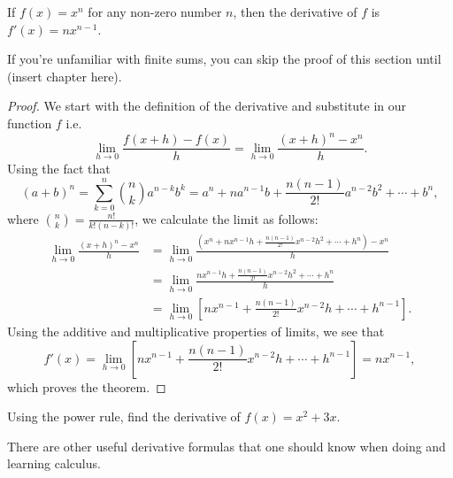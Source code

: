 \begin{prop}\label{PowRule}
	If $f(x)=x^n$ for any non-zero number $n$, then the derivative of $f$ is  $f'(x)=nx^{n-1}$.
\end{prop}

If you're unfamiliar with finite sums, you can skip the proof of this section until (insert chapter here).

\begin{proof}
	We start with the definition of the derivative and substitute in our function $f$ i.e.
	\begin{equation}
		\lim\limits_{h\to 0}\frac{f(x+h)-f(x)}{h}
=	\lim\limits_{h\to 0}\frac{(x+h)^n-x^n}{h}.
	\end{equation}
	Using the fact that \begin{equation}
		(a+b)^n=\sum^n_{k=0} \binom{n}{k}a^{n-k}b^k=a^n+na^{n-1}b+ \frac{n(n-1)}{2!}a^{n-2}b^2+\dotsb+b^n,
	\end{equation}
	where $\binom{n}{k}=\frac{n!}{k!(n-k)!}$,
	we calculate the limit as follows:
	\begin{align}
		\lim\limits_{h\to 0}\frac{(x+h)^n-x^n}{h}&=\lim\limits_{h\to 0}\frac{(x^n+nx^{n-1}h+ \frac{n(n-1)}{2!}x^{n-2}h^2+\dotsb+h^n)-x^n}{h}\\
	&=\lim\limits_{h\to 0}\frac{nx^{n-1}h+ \frac{n(n-1)}{2!}x^{n-2}h^2+\dotsb+h^n}{h}\\
	& =\lim\limits_{h\to 0} \left[ nx^{n-1}+ \frac{n(n-1)}{2!}x^{n-2}h+\dotsb+h^{n-1}\right] .
	\end{align}
Using the additive and multiplicative properties of limits, we see that
\begin{equation}
	f'(x)=\lim\limits_{h\to 0} \left[nx^{n-1}+ \frac{n(n-1)}{2!}x^{n-2}h+\dotsb+h^{n-1}\right]=nx^{n-1},
\end{equation}
which proves the theorem.
\end{proof}


\begin{exmp}
	Using the power rule, find the derivative of $f(x)=x^2+3x$.
\end{exmp}



There are other useful derivative formulas that one should know when doing and learning calculus.

